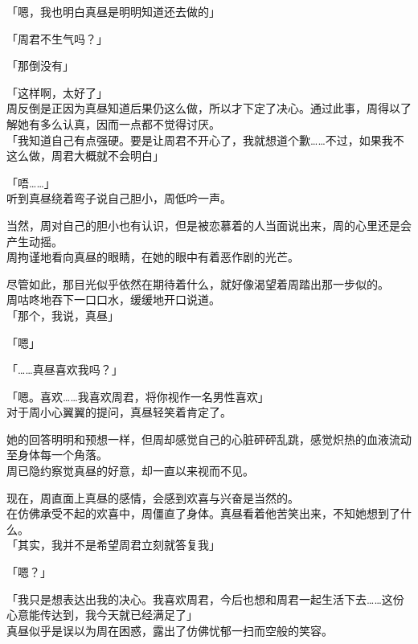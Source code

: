 「嗯，我也明白真昼是明明知道还去做的」

「周君不生气吗？」

「那倒没有」

「这样啊，太好了」\\

周反倒是正因为真昼知道后果仍这么做，所以才下定了决心。通过此事，周得以了解她有多么认真，因而一点都不觉得讨厌。\\

「我知道自己有点强硬。要是让周君不开心了，我就想道个歉……不过，如果我不这么做，周君大概就不会明白」

「唔……」\\

听到真昼绕着弯子说自己胆小，周低吟一声。

当然，周对自己的胆小也有认识，但是被恋慕着的人当面说出来，周的心里还是会产生动摇。\\

周拘谨地看向真昼的眼睛，在她的眼中有着恶作剧的光芒。

尽管如此，那目光似乎依然在期待着什么，就好像渴望着周踏出那一步似的。\\

周咕咚地吞下一口口水，缓缓地开口说道。\\

「那个，我说，真昼」

「嗯」

「……真昼喜欢我吗？」

「嗯。喜欢……我喜欢周君，将你视作一名男性喜欢」\\

对于周小心翼翼的提问，真昼轻笑着肯定了。

她的回答明明和预想一样，但周却感觉自己的心脏砰砰乱跳，感觉炽热的血液流动至身体每一个角落。\\

周已隐约察觉真昼的好意，却一直以来视而不见。

现在，周直面上真昼的感情，会感到欢喜与兴奋是当然的。\\

在仿佛承受不起的欢喜中，周僵直了身体。真昼看着他苦笑出来，不知她想到了什么。\\

「其实，我并不是希望周君立刻就答复我」

「嗯？」

「我只是想表达出我的决心。我喜欢周君，今后也想和周君一起生活下去……这份心意能传达到，我今天就已经满足了」\\

真昼似乎是误以为周在困惑，露出了仿佛忧郁一扫而空般的笑容。\\

